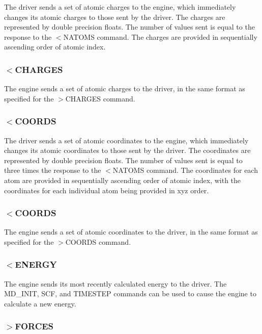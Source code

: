 The driver sends a set of atomic charges to the engine, which immediately changes its atomic charges to those sent by the driver. The charges are represented by double precision floats. The number of values sent is equal to the response to the $<$N\-A\-T\-O\-M\-S command. The charges are provided in sequentially ascending order of atomic index.\hypertarget{index_recv_charges}{}\subsubsection{$<$\-C\-H\-A\-R\-G\-E\-S}\label{index_recv_charges}
The engine sends a set of atomic charges to the driver, in the same format as specified for the {\ttfamily $>$C\-H\-A\-R\-G\-E\-S} command.\hypertarget{index_send_coords}{}\subsubsection{$<$\-C\-O\-O\-R\-D\-S}\label{index_send_coords}
The driver sends a set of atomic coordinates to the engine, which immediately changes its atomic coordinates to those sent by the driver. The coordinates are represented by double precision floats. The number of values sent is equal to three times the response to the $<$N\-A\-T\-O\-M\-S command. The coordinates for each atom are provided in sequentially ascending order of atomic index, with the coordinates for each individual atom being provided in xyz order.\hypertarget{index_send_coords}{}\subsubsection{$<$\-C\-O\-O\-R\-D\-S}\label{index_send_coords}
The engine sends a set of atomic coordinates to the driver, in the same format as specified for the {\ttfamily $>$C\-O\-O\-R\-D\-S} command.\hypertarget{index_recv_energy}{}\subsubsection{$<$\-E\-N\-E\-R\-G\-Y}\label{index_recv_energy}
The engine sends its most recently calculated energy to the driver. The {\ttfamily M\-D\-\_\-\-I\-N\-I\-T}, {\ttfamily S\-C\-F}, and {\ttfamily T\-I\-M\-E\-S\-T\-E\-P} commands can be used to cause the engine to calculate a new energy.\hypertarget{index_send_forces}{}\subsubsection{$>$\-F\-O\-R\-C\-E\-S}\label{index_send_forces}
